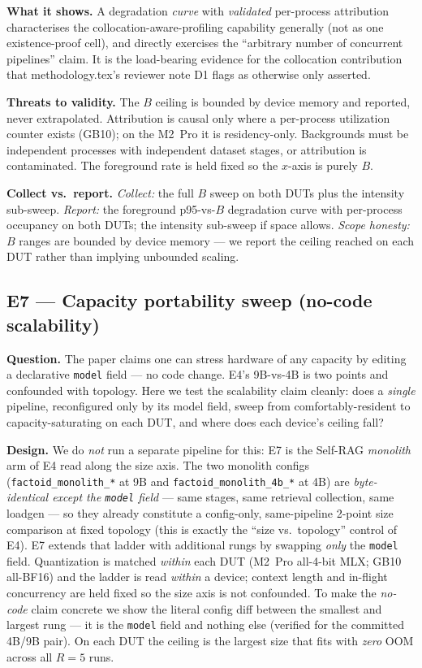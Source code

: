 \textbf{What it shows.} A degradation \emph{curve} with \emph{validated}
per-process attribution characterises the collocation-aware-profiling
capability generally (not as one existence-proof cell), and directly
exercises the ``arbitrary number of concurrent pipelines'' claim. It is the
load-bearing evidence for the collocation contribution that
methodology.tex's reviewer note D1 flags as otherwise only asserted.

\textbf{Threats to validity.} The $B$ ceiling is bounded by device memory
and reported, never extrapolated. Attribution is causal only where a
per-process utilization counter exists (GB10); on the M2~Pro it is
residency-only. Backgrounds must be independent processes with independent
dataset stages, or attribution is contaminated. The foreground rate is
held fixed so the $x$-axis is purely $B$.

\textbf{Collect vs.\ report.} \emph{Collect:} the full $B$ sweep on both
DUTs plus the intensity sub-sweep. \emph{Report:} the foreground p95-vs-$B$
degradation curve with per-process occupancy on both DUTs; the intensity
sub-sweep if space allows. \emph{Scope honesty:} $B$ ranges are bounded by
device memory --- we report the ceiling reached on each DUT rather than
implying unbounded scaling.

\subsection{E7 --- Capacity portability sweep (no-code scalability)}
\label{sec:e7-sweep}

\textbf{Question.} The paper claims one can stress hardware of any capacity
by editing a declarative \texttt{model} field --- no code change. E4's
9B-vs-4B is two points and confounded with topology. Here we test the
scalability claim cleanly: does a \emph{single} pipeline, reconfigured only
by its model field, sweep from comfortably-resident to
capacity-saturating on each DUT, and where does each device's ceiling fall?

\textbf{Design.} We do \emph{not} run a separate pipeline for this: E7 is
the Self-RAG \emph{monolith} arm of E4 read along the size axis. The two
monolith configs (\texttt{factoid\_monolith\_*} at 9B and
\texttt{factoid\_monolith\_4b\_*} at 4B) are \emph{byte-identical except the
\texttt{model} field} --- same stages, same retrieval collection, same
loadgen --- so they already constitute a config-only, same-pipeline
2-point size comparison at fixed topology (this is exactly the ``size vs.\
topology'' control of E4). E7 extends that ladder with additional rungs by
swapping \emph{only} the \texttt{model} field. Quantization is matched
\emph{within} each DUT (M2~Pro all-4-bit MLX; GB10 all-BF16) and the ladder
is read \emph{within} a device; context length and in-flight concurrency
are held fixed so the size axis is not confounded. To make the
\emph{no-code} claim concrete we show the literal config diff between the
smallest and largest rung --- it is the \texttt{model} field and nothing
else (verified for the committed 4B/9B pair). On each DUT the ceiling is
the largest size that fits with \emph{zero} OOM across all $R{=}5$ runs.


